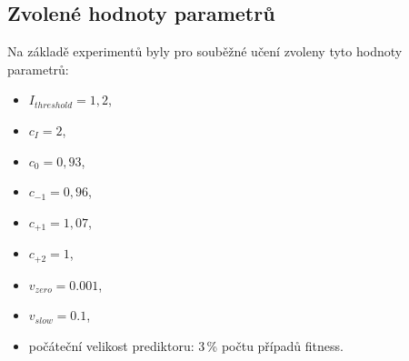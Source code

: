 \subsection{Zvolené hodnoty parametrů}

Na základě experimentů byly pro souběžné učení zvoleny tyto hodnoty parametrů:




\begin{itemize}
    \item $I_\mathit{threshold} = 1,2$,
    \item $c_I = 2$,
    \item $c_0 = 0,93$,
    \item $c_{-1} = 0,96$,
    \item $c_{+1} = 1,07$,
    \item $c_{+2} = 1$,
    \item $v_\mathit{zero} = 0.001$,
    \item $v_\mathit{slow} = 0.1$,
    \item počáteční velikost prediktoru: 3\,\% počtu případů fitness.
\end{itemize}


